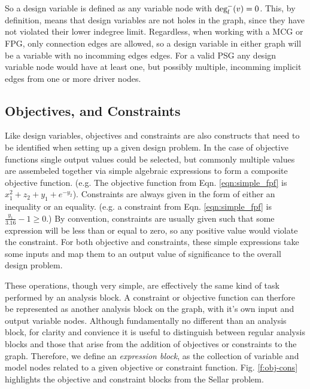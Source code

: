 So a design variable is defined as any variable node with $\textrm{deg}_l^-(v)=0$. 
This, by definition, means that design variables are not holes in the graph, since 
they have not violated their lower indegree limit. Regardless, 
when working with a MCG or FPG, only connection edges are allowed, so a design 
variable in either graph will be a variable with no incomming edges edges. For a valid PSG 
any design variable node would have at least one, but possibly multiple, incomming 
implicit edges from one or more driver nodes. 

\subsection{Objectives, and Constraints}
\label{ss:objectives and constraints}
Like design variables, objectives and constraints are also constructs that need 
to be identified when setting up a given design problem. In the case of 
objective functions single output values could be selected, but commonly multiple 
values are assembeled together via simple algebraic expressions to form a composite 
objective function. (e.g. The objective function from Eqn. \ref{eqn:simple_fpf} is
$x_1^2+z_2+y_1+e^{-y_2}$). Constraints are always given in the 
form of either an inequality or an equality. (e.g. a constraint from Eqn. 
\ref{eqn:simple_fpf} is $\frac{y_1}{3.16}-1\geq0$.) By convention, 
constraints are usually given such that some expression will be less than or equal 
to zero, so any positive value would violate the constraint. For both objective 
and constraints, these simple expressions take some inputs and map them to an
output value of significance to the overall design problem. 

These operations, though very simple, are effectively the same kind of task 
performed by an analysis block. A constraint or objective function can therfore 
be represented as another analysis block on the graph, with it's own input and 
output variable nodes. Although fundamentally no different than an analysis block, 
for clarity and convience it is useful to distinguish between regular analysis 
blocks and those that arise from the addition of objectives or constraints to 
the graph. Therefore, we define an \emph{expression block}, as the collection of variable and model 
nodes related to a given objective or constraint function. Fig. \ref{f:obj-cons}
highlights the objective and constraint blocks from the Sellar problem. 



